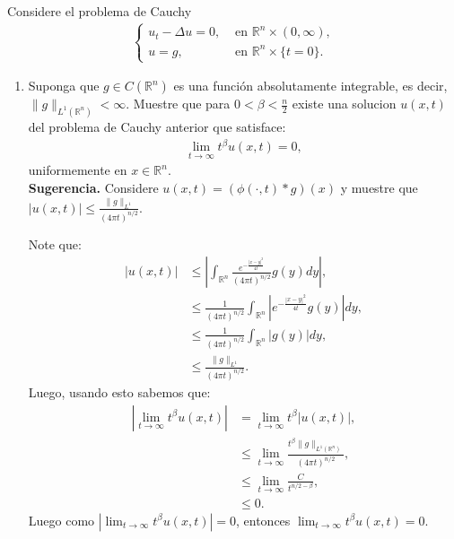\begin{homeworkProblem}
  Considere el problema de Cauchy
  \begin{align*}
    \begin{cases}
      u_t-\Delta u=0, &\text{ en } \mathbb{R}^{n}\times (0,\infty) \text{,} \\
      u=g, &\text{ en } \mathbb{R}^{n}\times\{t=0\} .
    \end{cases}
  \end{align*}
  \begin{enumerate}
    \item Suponga que $g\in C(\mathbb{R}^{n})$ es una función absolutamente integrable, es decir,$\|g\|_{L^1(\mathbb{R}^{n})}< \infty$. Muestre que para $0< \beta < \frac{n}{2}$ existe una solucion $u(x,t)$ del problema de Cauchy anterior que satisface:
    \begin{align*}
      \lim_{t\rightarrow\infty}t^{\beta}u(x,t)=0,
    \end{align*}
    uniformemente en $x\in\mathbb{R}^{n}$.\\
    \textbf{Sugerencia.} Considere $u(x,t)=(\phi(\cdot,t)*g)(x)$ y muestre que $|u(x,t)|\leq \frac{\|g\|_{L^1}}{(4\pi t)^{n/2}}$.
    \begin{solucion}
      Note que:
      \begin{align*}
        |u(x,t)|&\leq \left| \int_{\mathbb{R}^{n}}\frac{e^{-\frac{|x-y|^2}{4t}}}{(4\pi t)^{n/2}}g(y)dy \right|,\\
        &\leq \frac{1}{(4\pi t)^{n/2}}\int_{\mathbb{R}^{n}}\left| e^{-\frac{|x-y|^2}{4t}}g(y) \right|dy,\\
        &\leq \frac{1}{(4\pi t)^{n/2}}\int_{\mathbb{R}^{n}}\left| g(y) \right|dy,\\
        &\leq \frac{\|g\|_{L^1}}{(4\pi t)^{n/2}}.
      \end{align*}
      Luego, usando esto sabemos que:
      \begin{align*}
        \left|\lim_{t \rightarrow \infty}t^{\beta}u(x,t)\right|&=\lim_{t\rightarrow\infty}t^{\beta}|u(x,t)|,\\
        &\leq\lim_{t \rightarrow \infty}\frac{t^{\beta}\|g\|_{L^1(\mathbb{R}^{n})}}{(4\pi t)^{n/2}},\\
        &\leq \lim_{t\rightarrow\infty} \frac{C}{t^{n/2-\beta}},\\
        &\leq 0.
      \end{align*}
      Luego como $|\lim_{t\rightarrow\infty}t^{\beta}u(x,t)|=0$, entonces $\lim_{t\rightarrow \infty}t^{\beta}u(x,t)=0$.

\end{solucion}
\end{enumerate}
\end{homeworkProblem}
